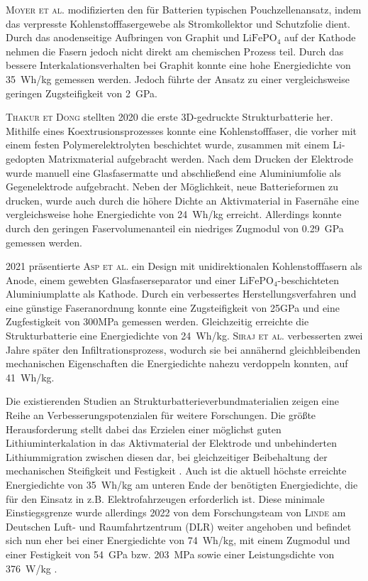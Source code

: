 \textsc{Moyer et al.} \cite{Moyer2020} modifizierten den für Batterien typischen Pouchzellenansatz, indem das verpresste Kohlenstofffasergewebe als Stromkollektor und Schutzfolie dient. Durch das anodenseitige Aufbringen von Graphit und $\text{LiFePO}_\text{4}$ auf der Kathode nehmen die Fasern jedoch nicht direkt am chemischen Prozess teil. Durch das bessere Interkalationsverhalten bei Graphit konnte eine hohe Energiedichte von 35~Wh/kg gemessen werden. Jedoch führte der Ansatz zu einer vergleichsweise geringen Zugsteifigkeit von 2~GPa.

\textsc{Thakur et Dong} \cite{Thakur2020} stellten 2020 die erste 3D-gedruckte Strukturbatterie her. Mithilfe eines Koextrusionsprozesses konnte eine Kohlenstofffaser, die vorher mit einem festen Polymerelektrolyten beschichtet wurde, zusammen mit einem Li-gedopten Matrixmaterial aufgebracht werden. Nach dem Drucken der Elektrode wurde manuell eine Glasfasermatte und abschließend eine Aluminiumfolie als Gegenelektrode aufgebracht. Neben der Möglichkeit, neue Batterieformen zu drucken, wurde auch durch die höhere Dichte an Aktivmaterial in Fasernähe eine vergleichsweise hohe Energiedichte von 24~Wh/kg erreicht. Allerdings konnte durch den geringen Faservolumenanteil ein niedriges Zugmodul von 0.29~GPa gemessen werden.

2021 präsentierte \textsc{Asp et al.} \cite{Asp2021} ein Design mit unidirektionalen Kohlenstofffasern als Anode, einem gewebten Glasfaserseparator und einer $\text{LiFePO}_\text{4}$-beschichteten Aluminiumplatte als Kathode. Durch ein verbessertes Herstellungsverfahren und eine günstige Faseranordnung konnte eine Zugsteifigkeit von 25GPa und eine Zugfestigkeit von 300MPa gemessen werden. Gleichzeitig erreichte die Strukturbatterie eine Energiedichte von 24~Wh/kg. \textsc{Siraj et al.} \cite{Siraj2023} verbesserten zwei Jahre später den Infiltrationsprozess, wodurch sie bei annähernd gleichbleibenden mechanischen Eigenschaften die Energiedichte nahezu verdoppeln konnten, auf 41~Wh/kg.



Die existierenden Studien an Strukturbatterieverbundmaterialien zeigen eine Reihe an Verbesserungspotenzialen für weitere Forschungen. Die größte Herausforderung stellt dabei das Erzielen einer möglichst guten Lithiuminterkalation in das Aktivmaterial der Elektrode und unbehinderten Lithiummigration zwischen diesen dar, bei gleichzeitiger Beibehaltung der mechanischen Steifigkeit und Festigkeit \cite{Asp2015}. Auch ist die aktuell höchste erreichte Energiedichte von 35~Wh/kg am unteren Ende der benötigten Energiedichte, die für den Einsatz in z.B. Elektrofahrzeugen erforderlich ist. Diese minimale Einstiegsgrenze wurde allerdings 2022 von dem Forschungsteam von \textsc{Linde} am Deutschen Luft- und Raumfahrtzentrum (DLR) weiter angehoben und befindet sich nun eher bei einer Energiedichte von 74~Wh/kg, mit einem Zugmodul und einer Festigkeit von 54~GPa bzw. 203~MPa sowie einer Leistungsdichte von 376~W/kg \cite{Ishfaq2022}.

